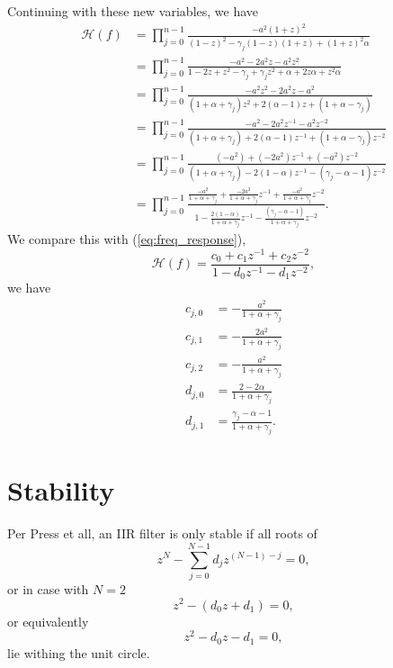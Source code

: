\documentclass[a4paper]{article}
\begin{document}
Continuing with these new variables, we have
\begin{align}
    \mathcal{H}(f) &= \prod_{j=0}^{n - 1}\frac{-a^2(1 + z)^2}
        {(1 - z)^2 - \gamma_j (1 - z)(1 + z) + (1 + z)^2 \alpha} \\
    &= \prod_{j=0}^{n - 1}\frac{-a^2 - 2a^2z - a^2z^2}
        {1 - 2z + z^2 - \gamma_j + \gamma_j z^2 + \alpha + 2z \alpha + z^2 \alpha} \\
    &= \prod_{j=0}^{n - 1}\frac{-a^2z^2 - 2a^2z - a^2}
        {(1 + \alpha + \gamma_j)z^2 + 2(\alpha - 1) z + (1 + \alpha - \gamma_j)} \\
    &= \prod_{j=0}^{n - 1}\frac{-a^2 - 2a^2 z^{-1} - a^2 z^{-2}}
        {(1 + \alpha + \gamma_j) + 2(\alpha - 1) z^{-1} + (1 + \alpha - \gamma_j) z^{-2}} \\
    &= \prod_{j=0}^{n - 1}\frac{(-a^2) + (-2a^2) z^{-1} + (-a^2)z^{-2}}
        {(1 + \alpha + \gamma_j) - 2(1 - \alpha) z^{-1} - (\gamma_j - \alpha - 1)z^{-2}}\\
    &= \prod_{j=0}^{n - 1}\frac{\frac{-a^2}{1 + \alpha + \gamma_j} + \frac{-2 a^2}{1 + \alpha + \gamma_j}z^{-1} + \frac{-a^2}{1 + \alpha + \gamma_j}z^{-2}}
        {1 - \frac{2(1 - \alpha)}{1 + \alpha + \gamma_j} z^{-1} - \frac{(\gamma_j - \alpha - 1)}{1 + \alpha + \gamma_j}z^{-2}}.
\end{align}
We compare this with (\ref{eq:freq_response}),
\begin{equation*}
\mathcal{H}(f) = \frac{c_0 + c_1 z^{-1} + c_2 z^{-2}}{1 - d_0 z^{-1} - d_1 z^{-2}},
\end{equation*}
we have
\begin{align}
    c_{j,0} &= -\frac{a^2}{1 + \alpha + \gamma_j} \\
    c_{j,1} &= -\frac{2 a^2}{1 + \alpha + \gamma_j} \\
    c_{j,2} &= -\frac{a^2}{1 + \alpha + \gamma_j} \\
    d_{j,0} &= \frac{2-2\alpha}{1 + \alpha + \gamma_j} \\
    d_{j,1} &= \frac{\gamma_j - \alpha - 1}{1 + \alpha + \gamma_j}.
\end{align}


\section{Stability}
Per Press et all, an IIR filter is only stable if all roots of
\begin{equation}
z^N - \sum^{N-1}_{j=0} d_j z^{(N-1)-j} = 0,\label{eq:stability}
\end{equation}
or in case with $N=2$
\begin{equation}
z^2 - (d_0 z + d_1) = 0,
\end{equation}
or equivalently
\begin{equation}
z^2 - d_0 z - d_1 = 0,
\end{equation}
lie withing the unit circle.
\end{document}
